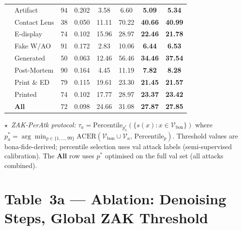 \documentclass{article}
\newcommand{\B}[1]{\textbf{#1}}
\begin{document}
\begin{table}[!htbp]
\begin{tabular}{l l c c c c c c}
& Artifact          & 94 & 0.202 &   3.58 &  6.60 &  \B{5.09} &  \B{5.34} \\
& Contact Lens      & 38 & 0.050 &  11.11 & 70.22 & \B{40.66} & \B{40.99} \\
& E-display         & 74 & 0.102 &  15.96 & 28.97 & \B{22.46} & \B{21.78} \\
& Fake W/AO         & 91 & 0.172 &   2.83 & 10.06 &  \B{6.44} &  \B{6.53} \\
& Generated         & 50 & 0.063 &  12.46 & 56.46 & \B{34.46} & \B{37.54} \\
& Post-Mortem       & 90 & 0.164 &   4.45 & 11.19 &  \B{7.82} &  \B{8.28} \\
& Print \& ED       & 79 & 0.115 &  19.61 & 23.30 & \B{21.45} & \B{21.57} \\
& Printed           & 74 & 0.102 &  17.77 & 28.97 & \B{23.37} & \B{23.42} \\
\cmidrule(lr){2-8}
& \textbf{All}      & 72 & 0.098 &  24.66 & 31.08 & \B{27.87} & \B{27.85} \\

\bottomrule
\end{tabular}

\vspace{4pt}
\noindent\footnotesize
$\star$~\textit{ZAK-PerAtk protocol:}
$\tau_a = \mathrm{Percentile}_{p_a^*}(\{s(x): x \in \mathcal{V}_{\mathrm{bon}}\})$
where $p_a^* = \arg\min_{p\in\{1,\ldots,99\}} \mathrm{ACER}(\mathcal{V}_{\mathrm{bon}} \cup \mathcal{V}_a,\, \mathrm{Percentile}_p)$.
Threshold values are bona-fide-derived; percentile selection uses val attack labels
(semi-supervised calibration).
The \textbf{All} row uses $p^*$ optimised on the full val set (all attacks combined).
\end{table}


\section*{Table~3a — Ablation: Denoising Steps, Global ZAK Threshold}
\end{document}
